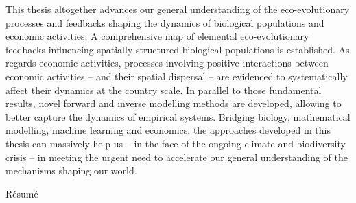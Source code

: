 {    This thesis altogether advances our general understanding of the eco-evolutionary processes and feedbacks shaping the dynamics of biological populations and economic activities. A comprehensive map of elemental eco-evolutionary feedbacks influencing spatially structured biological populations is established. As regards economic activities, processes involving positive interactions between economic activities -- and their spatial dispersal -- are evidenced to systematically affect their dynamics at the country scale. In parallel to those fundamental results, novel forward and inverse modelling methods are developed, allowing to better capture the dynamics of empirical systems. Bridging biology, mathematical modelling, machine learning and economics, the approaches developed in this thesis can massively help us -- in the face of the ongoing climate and biodiversity crisis -- in meeting the urgent need to accelerate our general understanding of the mechanisms shaping our world. 
}

\vspace*{20mm}

{Résumé}
\label{sec:summary-fr}
\vspace*{15mm}

